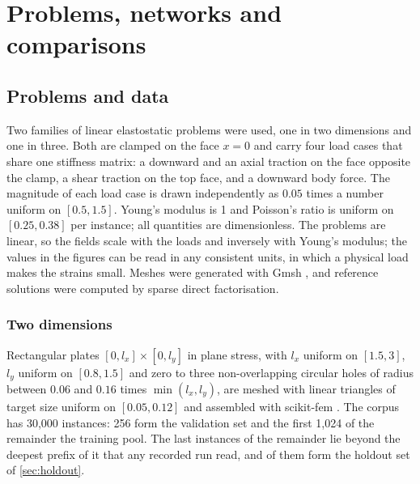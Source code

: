 \section{Problems, networks and comparisons}\label{sec:methods}

\subsection{Problems and data}\label{sec:methods:data}

Two families of linear elastostatic problems were used, one in two dimensions and one in
three. Both are clamped on the face $x=0$ and carry four load cases that share one stiffness
matrix: a downward and an axial traction on the face opposite the clamp, a shear traction on
the top face, and a downward body force. The magnitude of each load case is drawn
independently as $0.05$ times a number uniform on $[0.5,1.5]$. Young's modulus is 1 and
Poisson's ratio is uniform on $[0.25,0.38]$ per instance; all quantities are dimensionless.
The problems are linear, so the fields scale with the loads and inversely with Young's
modulus; the values in the figures can be read in any consistent units, in which a physical
load makes the strains small.
Meshes were generated with Gmsh \cite{Geuzaine2009}, and reference solutions were computed
by sparse direct factorisation.

\subsubsection{Two dimensions}
Rectangular plates $[0,l_x]\times[0,l_y]$ in plane stress, with $l_x$ uniform on $[1.5,3]$,
$l_y$ uniform on $[0.8,1.5]$ and zero to three non-overlapping circular holes of radius
between $0.06$ and $0.16$ times $\min(l_x,l_y)$, are meshed with linear triangles of target
size uniform on $[0.05,0.12]$ and assembled with scikit-fem \cite{Gustafsson2020}. The
corpus has 30,000 instances: 256 form the validation set and the first 1,024 of the
remainder the training pool. The last \numHoldTwoTail{} instances of the remainder lie
beyond the deepest prefix of it that any recorded run read, and \numHoldTwoN{} of them form
the holdout set of \cref{sec:holdout}.

